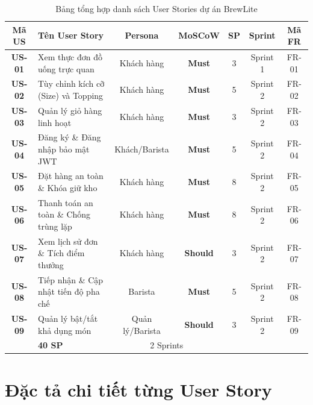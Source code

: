 \documentclass[12pt,a4paper]{article}
\begin{document}
\begin{table}[htbp]
\centering
\small
\begin{tabularx}{\textwidth}{|c|X|c|c|c|c|c|}
\hline
\rowcolor{brewPrimary!15}
\textbf{Mã US} & \textbf{Tên User Story} & \textbf{Persona} & \textbf{MoSCoW} & \textbf{SP} & \textbf{Sprint} & \textbf{Mã FR} \\
\hline
\textbf{US-01} & Xem thực đơn đồ uống trực quan & Khách hàng & \textbf{Must} & 3 & Sprint 1 & FR-01 \\
\hline
\textbf{US-02} & Tùy chỉnh kích cỡ (Size) và Topping & Khách hàng & \textbf{Must} & 5 & Sprint 2 & FR-02 \\
\hline
\textbf{US-03} & Quản lý giỏ hàng linh hoạt & Khách hàng & \textbf{Must} & 3 & Sprint 2 & FR-03 \\
\hline
\textbf{US-04} & Đăng ký \& Đăng nhập bảo mật JWT & Khách/Barista & \textbf{Must} & 5 & Sprint 2 & FR-04 \\
\hline
\textbf{US-05} & Đặt hàng an toàn \& Khóa giữ kho & Khách hàng & \textbf{Must} & 8 & Sprint 2 & FR-05 \\
\hline
\textbf{US-06} & Thanh toán an toàn \& Chống trùng lặp & Khách hàng & \textbf{Must} & 8 & Sprint 2 & FR-06 \\
\hline
\textbf{US-07} & Xem lịch sử đơn \& Tích điểm thưởng & Khách hàng & \textbf{Should} & 3 & Sprint 2 & FR-07 \\
\hline
\textbf{US-08} & Tiếp nhận \& Cập nhật tiến độ pha chế & Barista & \textbf{Must} & 5 & Sprint 2 & FR-08 \\
\hline
\textbf{US-09} & Quản lý bật/tắt khả dụng món & Quản lý/Barista & \textbf{Should} & 3 & Sprint 2 & FR-09 \\
\hline
\rowcolor{brewSecondary!20}
\multicolumn{4}{|c|}{\textbf{TỔNG CỘNG ĐIỂM STORY POINTS TOÀN DỰ ÁN}} & \textbf{40 SP} & \multicolumn{2}{c|}{2 Sprints} \\
\hline
\end{tabularx}
\caption{Bảng tổng hợp danh sách User Stories dự án BrewLite}
\label{tab:user_stories_summary}
\end{table}

\newpage

\section{Đặc tả chi tiết từng User Story}
\end{document}
